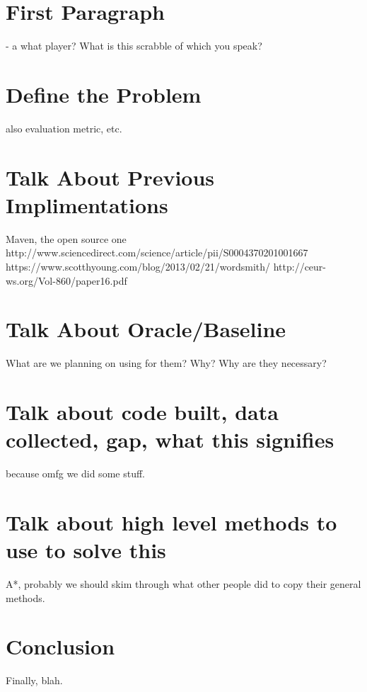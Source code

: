 \documentclass[12pt]{article}
\begin{document}
\section{First Paragraph}
- a what player? What is this scrabble of which you speak? 

\section{Define the Problem}
  also evaluation metric, etc. 
\section{Talk About Previous Implimentations}
Maven, the open source one
http://www.sciencedirect.com/science/article/pii/S0004370201001667
https://www.scotthyoung.com/blog/2013/02/21/wordsmith/
http://ceur-ws.org/Vol-860/paper16.pdf
\section{Talk About Oracle/Baseline}
What are we planning on using for them? Why? Why are they necessary? 
\section{Talk about code built, data collected, gap, what this signifies}
because omfg we did some stuff. 
\section{Talk about high level methods to use to solve this}
A*, probably we should skim through what other people did to copy their general methods. 
\section*{Conclusion}

Finally, blah.
\end{document}
